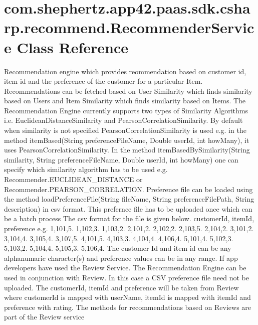 \hypertarget{classcom_1_1shephertz_1_1app42_1_1paas_1_1sdk_1_1csharp_1_1recommend_1_1_recommender_service}{\section{com.\+shephertz.\+app42.\+paas.\+sdk.\+csharp.\+recommend.\+Recommender\+Service Class Reference}
\label{classcom_1_1shephertz_1_1app42_1_1paas_1_1sdk_1_1csharp_1_1recommend_1_1_recommender_service}
}


Recommendation engine which provides reommendation based on customer id, item id and the preference of the customer for a particular Item. Recommendations can be fetched based on User Similarity which finds similarity based on Users and Item Similarity which finds similarity based on Items. The Recommendation Engine currently supports two types of Similarity Algorithms i.\+e. Euclidean\+Distance\+Similarity and Pearson\+Correlation\+Similarity. By default when similarity is not specified Pearson\+Correlation\+Similarity is used e.\+g. in the method item\+Based(\+String preference\+File\+Name, Double   user\+Id, int  how\+Many), it uses Pearson\+Correlation\+Similarity. In the method item\+Based\+By\+Similarity(\+String similarity, String preference\+File\+Name, Double   user\+Id, int  how\+Many) one can specify which similarity algorithm has to be used e.\+g. Recommender.\+E\+U\+C\+L\+I\+D\+E\+A\+N\+\_\+\+D\+I\+S\+T\+A\+N\+C\+E or Recommender.\+P\+E\+A\+R\+S\+O\+N\+\_\+\+C\+O\+R\+R\+E\+L\+A\+T\+I\+O\+N. Preference file can be loaded using the method load\+Preference\+File(\+String file\+Name, String preference\+File\+Path, String description) in csv format. This prefernce file has to be uploaded once which can be a batch process The csv format for the file is given below. customer\+Id, item\+Id, preference e.\+g. 1,101,5. 1,102,3. 1,103,2. 2,101,2. 2,102,2. 2,103,5. 2,104,2. 3,101,2. 3,104,4. 3,105,4. 3,107,5. 4,101,5. 4,103,3. 4,104,4. 4,106,4. 5,101,4. 5,102,3. 5,103,2. 5,104,4. 5,105,3. 5,106,4. The customer Id and item id can be any alphanumaric character(s) and preference values can be in any range. If app developers have used the Review Service. The Recommendation Engine can be used in conjunction with Review. In this case a C\+S\+V preference file need not be uploaded. The customer\+Id, item\+Id and preference will be taken from Review where customer\+Id is mapped with user\+Name, item\+Id is mapped with item\+Id and preference with rating. The methods for recommendations based on Reviews are part of the Review service  


